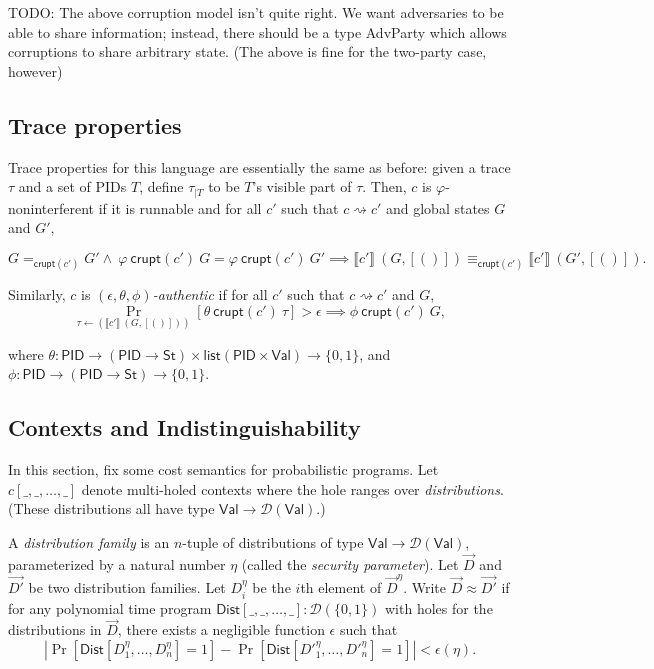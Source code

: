 \documentclass{article}
\newcommand{\Val}{\mathsf{Val}}
\newcommand{\St}{\mathsf{St}}
\newcommand{\PID}{\mathsf{PID}}
\newcommand{\List}{\mathsf{list}}
\newcommand{\D}{\mathcal{D}}
\begin{document}
TODO: The above corruption model isn't quite right. We want adversaries to be able to share information; instead, there should be a type \textsf{AdvParty} which allows corruptions to share arbitrary state. (The above is fine for the two-party case, however)

\subsection{Trace properties}

Trace properties for this language are essentially the same as before: given a trace $\tau$ and a set of PIDs $T$, define $\tau_{| T}$ to be $T$'s visible part of $\tau$. Then, $c$ is $\varphi$-noninterferent if it is runnable and for all $c'$ such that $c \rightsquigarrow c'$ and global states $G$ and $G'$,

\[ G=_{\mathsf{crupt}(c')}G' \wedge\ \varphi\ \mathsf{crupt}(c')\ G = \varphi\ \mathsf{crupt}(c')\ G' \implies \llbracket c' \rrbracket\ (G, [()]) \equiv_{\mathsf{crupt}(c')} \llbracket c' \rrbracket\ (G', [()]).\]

Similarly, $c$ is \emph{$(\epsilon, \theta, \phi)$-authentic} if for all $c'$ such that $c \rightsquigarrow c'$ and $G$,
\[ \Pr_{\tau \leftarrow (\llbracket c' \rrbracket\ (G, [()]))}[\theta\ \mathsf{crupt}(c')\ \tau] > \epsilon \implies \phi\ \mathsf{crupt}(c')\ G,\]

where $\theta : \PID \to (\PID \to \St) \times \List (\PID \times \Val) \to \{0,1\}$, and $\phi : \PID \to (\PID \to \St) \to \{0,1\}$.

\subsection{Contexts and Indistinguishability}


In this section, fix some cost semantics for probabilistic programs.
Let $c[\_, \_, \dots, \_]$ denote multi-holed contexts where the hole ranges over \emph{distributions}. (These distributions all have type $\Val \to \D(\Val)$.)

A \emph{distribution family} is an $n$-tuple of distributions of type $\Val \to \D(\Val)$, parameterized by a natural number $\eta$ (called the \emph{security parameter}). Let $\vec{D}$ and $\vec{D'}$ be two distribution families. Let $D_i^\eta$ be the $i$th element of $\vec{D}^\eta$. Write $\vec{D} \approx \vec{D'}$ if for any polynomial time program $\mathsf{Dist}[\_, \_, \dots, \_] : \D(\{0,1\})$ with holes for the distributions in $\vec{D}$, there exists a negligible function $\epsilon$ such that
\[|\Pr[\mathsf{Dist}[D_1^\eta, \dots, D_n^\eta] = 1] - \Pr[\mathsf{Dist}[D'^\eta_1, \dots, D'^\eta_n] = 1]| < \epsilon(\eta).\]
\end{document}
